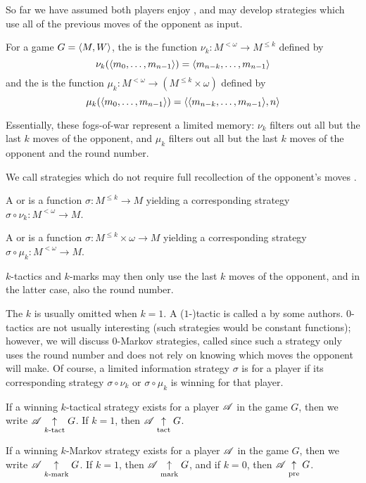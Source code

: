 So far we have assumed both players enjoy , and
may develop strategies which use all of the previous moves of the opponent
as input.

\begin{defn}
  For a game $G=\langle M,W\rangle$, the  is the function
  $\nu_k:M^{<\omega}\to M^{\leq k}$ defined by
    \[
      \nu_k(\langle m_0,\dots,m_{n-1}\rangle)=\langle m_{n-k},\dots,m_{n-1}\rangle
    \]
  and the  is the function
  $\mu_k:M^{<\omega}\to (M^{\leq k}\times\omega)$ defined by
    \[
      \mu_k(\langle m_0,\dots,m_{n-1}\rangle)=\langle\langle m_{n-k},\dots,m_{n-1}\rangle,n\rangle
    \]
\end{defn}

Essentially, these fogs-of-war represent a limited memory: $\nu_k$ filters out
all but the last $k$ moves of the opponent, and $\mu_k$ filters out all but
the last $k$ moves of the opponent and the round number.

We call strategies which do not require full recollection of the opponent's
moves .

\begin{defn}
  A  or  is a function
  $\sigma:M^{\leq k}\to M$ yielding a corresponding strategy
  $\sigma\circ\nu_k:M^{<\omega}\to M$.

  A  or  is a function
  $\sigma:M^{\leq k}\times\omega\to M$ yielding a corresponding strategy
  $\sigma\circ\mu_k:M^{<\omega}\to M$.
\end{defn}

$k$-tactics and $k$-marks may then only use the last $k$ moves of the opponent,
and in the latter case, also the round number.

The $k$ is usually omitted when $k=1$. A ($1$-)tactic is
called a  by some authors. $0$-tactics are not
usually interesting (such strategies would be constant functions); however,
we will discuss $0$-Markov strategies, called
 since such a strategy only uses the round
number and does not rely on knowing which moves the opponent will make.
Of course, a limited information strategy $\sigma$ is  for a
player if its corresponding strategy $\sigma\circ\nu_k$ or $\sigma\circ\mu_k$
is winning for that player.

\begin{defn}
  If a winning $k$-tactical strategy exists for a player $\mathscr{A}$ in the game
  $G$, then we write $\mathscr{A} \underset{k\text{-tact}}{\uparrow} G$. If $k=1$, then $\mathscr{A} \underset{\text{tact}}{\uparrow} G$.

  If a winning $k$-Markov strategy exists for a player $\mathscr{A}$ in the game
  $G$, then we write $\mathscr{A} \underset{k\text{-mark}}{\uparrow} G$. If $k=1$, then $\mathscr{A} \underset{\text{mark}}{\uparrow} G$,
  and if $k=0$, then $\mathscr{A} \underset{\text{pre}}{\uparrow} G$.
\end{defn}

